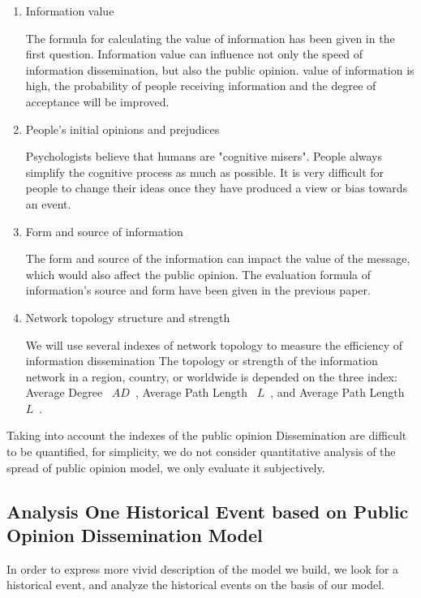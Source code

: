 \documentclass[a4paper,11pt]{article}
\begin{document}
\begin{enumerate}%
\renewcommand{\labelenumi}{(\theenumi)}
    \item Information value

    The formula for calculating the value of information has been given in the first question. Information value can influence not only the speed of information dissemination, but also the public opinion. value of information is high, the probability of people receiving information and the degree of acceptance will be improved.


    \item People's initial opinions and prejudices

    Psychologists believe that humans are "cognitive misers"\cite{RE}. People always simplify the cognitive process as much as possible. It is very difficult for people to change their ideas once they have produced a view or bias towards an event.
    \item Form and source of information

    The form and source of the information can impact the value of the message, which would also affect the public opinion. The evaluation formula of information's source and form have been given in the previous paper.


    \item Network topology structure and strength

    We will use several indexes of network topology to measure the efficiency of information dissemination
    The topology or strength of the information network in a region, country, or worldwide is depended on the three index: Average Degree ~$AD$~, Average Path Length ~$L$~, and Average Path Length ~$L$~.
\end{enumerate}
\par Taking into account the indexes of the public opinion Dissemination are difficult to be quantified, for simplicity, we do not consider quantitative analysis of the spread of public opinion model, we only evaluate it subjectively.

\subsection{Analysis One Historical Event based on Public Opinion Dissemination Model}
\par In order to express more vivid description of the model we build, we look for a historical event, and analyze the historical events on the basis of our model.
\end{document}
